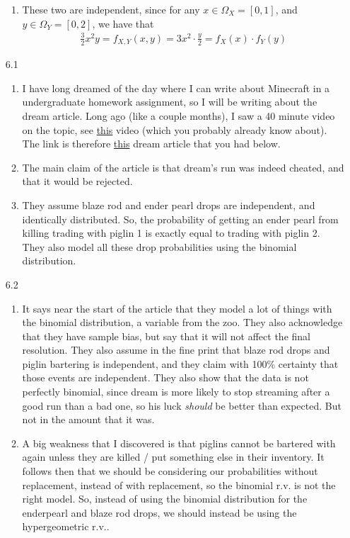 \documentclass[12pt]{article}
\theoremstyle{definitionstyle}
\begin{document}
\begin{enumerate}[leftmargin=\labelsep]
\begin{enumerate}
			\item These two are independent, since for any $x \in \Omega_X = [0, 1]$, and $y \in \Omega_Y = [0, 2]$, we have that
			\begin{align*}
				\frac32 x^2y = f_{X,Y}(x, y) = 3x^2 \cdot \frac y2 = f_X(x) \cdot f_Y(y)
			\end{align*}
		\end{enumerate}
	
		\newpage
		\item[6.1]
		\begin{enumerate}
			\item I have long dreamed of the day where I can write about Minecraft in a undergraduate homework assignment, so I will be writing about the dream article. Long ago (like a couple months), I saw a 40 minute video on the topic, see \href{https://www.youtube.com/watch?v=8Ko3TdPy0TU}{this} video (which you probably already know about). The link is therefore \href{https://mcspeedrun.com/dream.pdf}{this} dream article that you had below.
			
			\item The main claim of the article is that dream's run was indeed cheated, and that it would be rejected.
			
			\item They assume blaze rod and ender pearl drops are independent, and identically distributed. So, the probability of getting an ender pearl from killing trading with piglin 1 is exactly equal to trading with piglin 2. They also model all these drop probabilities using the binomial distribution.
		\end{enumerate}
	
		\item[6.2]
		\begin{enumerate}
			\item It says near the start of the article that they model a lot of things with the binomial distribution, a variable from the zoo. They also acknowledge that they have sample bias, but say that it will not affect the final resolution. They also assume in the fine print that blaze rod drops and piglin bartering is independent, and they claim with 100\% certainty that those events are independent. They also show that the data is not perfectly binomial, since dream is more likely to stop streaming after a good run than a bad one, so his luck \textit{should} be better than expected. But not in the amount that it was. 
			
			\item A big weakness that I discovered is that piglins cannot be bartered with again unless they are killed / put something else in their inventory. It follows then that we should be considering our probabilities without replacement, instead of with replacement, so the binomial r.v. is not the right model. So, instead of using the binomial distribution for the enderpearl and blaze rod drops, we should instead be using the hypergeometric r.v.. 
			

\end{enumerate}
\end{enumerate}
\end{document}
